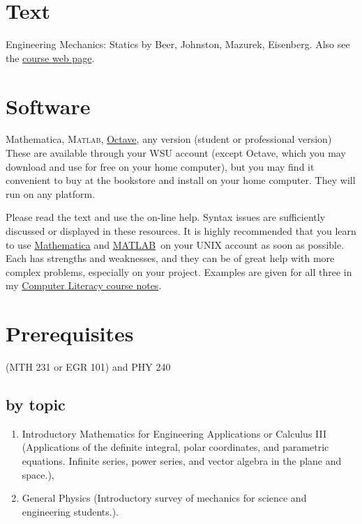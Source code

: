 \documentclass[10pt]{article}
\newcommand{\comp}[1]{{\small\textsf{#1}}}
\newcommand{\matlab}{\href{http://www.mathworks.com}{M{\small ATLAB}}}
\begin{document}
\section*{Text}
Engineering Mechanics: Statics by Beer, Johnston, Mazurek, Eisenberg.
Also see the \href{http://www.cs.wright.edu/~jslater/classes}{course web page}. 

\section*{Software}
\noindent Mathematica, \textsc{Matlab}, \href{http://www.octave.org}{Octave}, any version (student or professional version) \\
These are available through your WSU account (except Octave, which you may download and use for free on your home computer), but you may find it convenient to buy at the bookstore and install on your home computer. They will run on any platform.

Please read the text and use the on-line help.  Syntax issues are sufficiently discussed or displayed in these resources.  It is highly recommended that you learn to use \href{http://www.wolfram.com}{Mathematica} and \matlab\  on your UNIX account as soon as possible. Each has strengths and weaknesses, and they can be of great help with more complex problems, especially on your project. Examples are given for all three in my \href{http://www.cs.wright.edu/~jslater/classes/materials/CompLit.pdf}{Computer Literacy course notes}. 

\section*{Prerequisites}
(MTH 231 or EGR 101) and PHY 240

\subsection*{by topic}
\label{sec:topic}

\begin{enumerate}
\item Introductory Mathematics for Engineering Applications or Calculus III (Applications of the definite integral, polar coordinates, and parametric equations. Infinite series, power series, and vector algebra in the plane and space.),
\item General Physics (Introductory survey of mechanics for science and engineering students.).
\end{enumerate}
\end{document}
